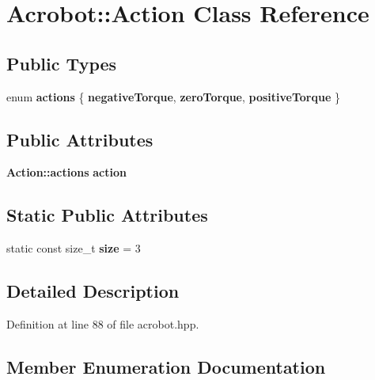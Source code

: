 \section{Acrobot\+:\+:Action Class Reference}
\label{classmlpack_1_1rl_1_1Acrobot_1_1Action}
\subsection*{Public Types}
\begin{DoxyCompactItemize}
\item 
enum \textbf{ actions} \{ \newline
\textbf{ negative\+Torque}, 
\newline
\textbf{ zero\+Torque}, 
\newline
\textbf{ positive\+Torque}
 \}
\end{DoxyCompactItemize}
\subsection*{Public Attributes}
\begin{DoxyCompactItemize}
\item 
\textbf{ Action\+::actions} \textbf{ action}
\end{DoxyCompactItemize}
\subsection*{Static Public Attributes}
\begin{DoxyCompactItemize}
\item 
static const size\+\_\+t \textbf{ size} = 3
\end{DoxyCompactItemize}


\subsection{Detailed Description}


Definition at line 88 of file acrobot.\+hpp.



\subsection{Member Enumeration Documentation}
\mbox{\label{classmlpack_1_1rl_1_1Acrobot_1_1Action_af806efc6052edbc741683ec893bb2fe1}} 
